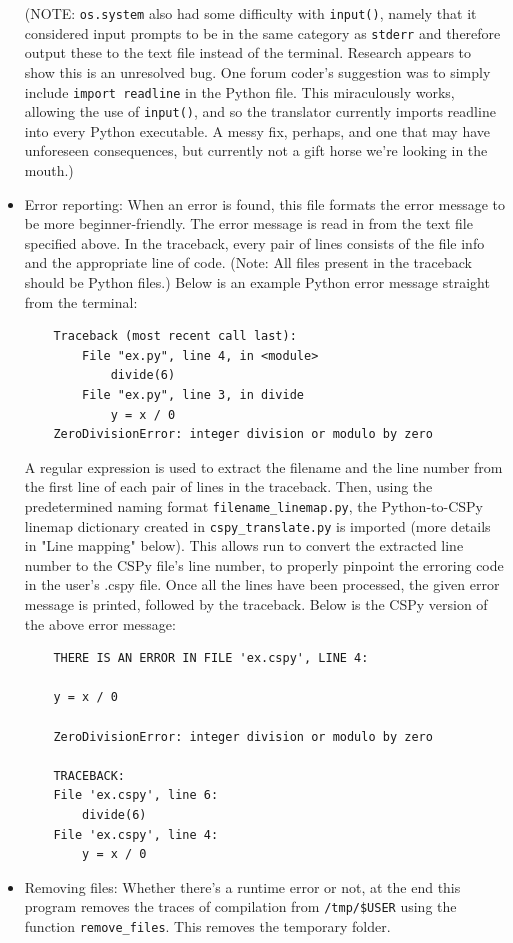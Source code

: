 \documentclass{article}
\begin{document}
\begin{itemize}
(NOTE: \verb|os.system| also had some difficulty with \verb|input()|, namely that it considered input prompts to be in the same category as \verb|stderr| and therefore output these to the text file instead of the terminal. Research appears to show this is an unresolved bug. One forum coder's suggestion was to simply include \verb|import readline| in the Python file. This miraculously works, allowing the use of \verb|input()|, and so the translator currently imports readline into every Python executable. A messy fix, perhaps, and one that may have unforeseen consequences, but currently not a gift horse we're looking in the mouth.)
\item Error reporting: When an error is found, this file formats the error message to be more beginner-friendly. The error message is read in from the text file specified above. In the traceback, every pair of lines consists of the file info and the appropriate line of code. (Note: All files present in the traceback should be Python files.) Below is an example Python error message straight from the terminal:
\begin{verbatim}
    Traceback (most recent call last):
        File "ex.py", line 4, in <module>
            divide(6)
        File "ex.py", line 3, in divide
            y = x / 0
    ZeroDivisionError: integer division or modulo by zero
\end{verbatim}
A regular expression is used to extract the filename and the line number from the first line of each pair of lines in the traceback. Then, using the predetermined naming format \verb|filename_linemap.py|, the Python-to-CSPy linemap dictionary created in \verb|cspy_translate.py| is imported (more details in "Line mapping" below). This allows run to convert the extracted line number to the CSPy file's line number, to properly pinpoint the erroring code in the user's .cspy file. Once all the lines have been processed, the given error message is printed, followed by the traceback. Below is the CSPy version of the above error message:
\begin{verbatim}
    THERE IS AN ERROR IN FILE 'ex.cspy', LINE 4:

    y = x / 0

    ZeroDivisionError: integer division or modulo by zero

    TRACEBACK:
    File 'ex.cspy', line 6:
        divide(6)
    File 'ex.cspy', line 4:
        y = x / 0
\end{verbatim}
\item Removing files: Whether there's a runtime error or not, at the end this program removes the traces of compilation from \verb|/tmp/$USER| using the function \verb|remove_files|. This removes the temporary folder.

\end{itemize}
\end{document}
